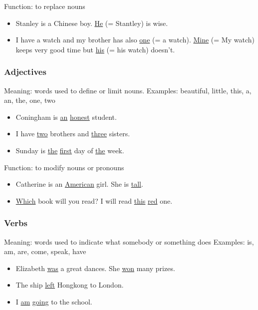 Function: to replace nouns
\begin{itemize}
    \item Stanley is a Chinese boy. \underline{He} (= Stantley) is wise.
    \item I have a watch and my brother has also \underline{one} (= a watch).
        \underline{Mine} (= My watch) keeps very good time but \underline{his}
        (= his watch) doesn't.
\end{itemize}

\subsubsection{Adjectives}
Meaning: words used to define or limit nouns.
\newline
\newline
Examples: beautiful, little, this, a, an, the, one, two
\begin{itemize}
    \item Coningham is \underline{an} \underline{honest} student.
    \item I have \underline{two} brothers and \underline{three} sisters.
    \item Sunday is \underline{the} \underline{first} day of \underline{the}
        week.
\end{itemize}

Function: to modify nouns or pronouns
\begin{itemize}
    \item Catherine is an \underline{American} girl. She is \underline{tall}.
    \item \underline{Which} book will you read? I will read \underline{this}
        \underline{red} one.
\end{itemize}

\subsubsection{Verbs}
Meaning: words used to indicate what somebody or something does
\newline
\newline
Examples: is, am, are, come, speak, have
\begin{itemize}
    \item Elizabeth \underline{was} a great dances. She \underline{won} many
        prizes.
    \item The ship \underline{left} Hongkong to London.
    \item I \underline{am} \underline{going} to the school.
\end{itemize}

